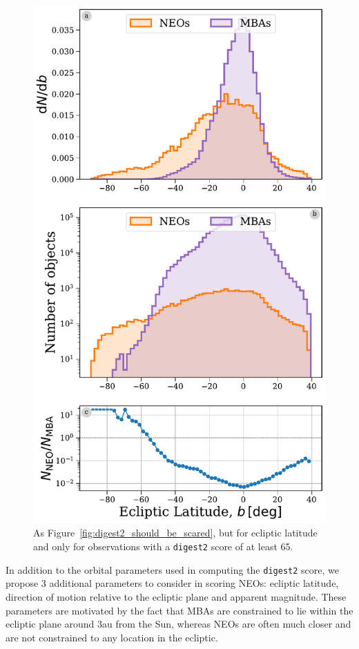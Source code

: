 \documentclass[twocolumn, twocolappendix]{aastex631}
\newcommand{\dig}{\texttt{digest2}}
\begin{document}
\begin{figure}[htb]
    \centering
    \includegraphics[width=\columnwidth]{figures/ecliptic_latitude_dist_highscore.pdf}
    \caption{As Figure~\ref{fig:digest2_should_be_scared}, but for ecliptic latitude and only for observations with a \dig{} score of at least 65.}
    \label{fig:ecl_lat_highscore}
\end{figure}

In addition to the orbital parameters used in computing the \dig{} score, we propose 3 additional parameters to consider in scoring NEOs: ecliptic latitude, direction of motion relative to the ecliptic plane and apparent magnitude. These parameters are motivated by the fact that MBAs are constrained to lie within the ecliptic plane around 3au from the Sun, whereas NEOs are often much closer and are not constrained to any location in the ecliptic.
\end{document}
